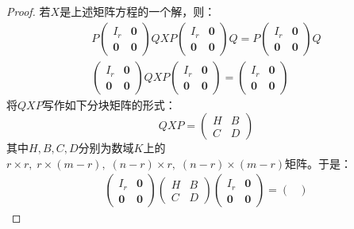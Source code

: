 \begin{proof}
	若$X$是上述矩阵方程的一个解，则：
	\begin{gather*}
		P
		\begin{pmatrix}
			I_r & \mathbf{0} \\
			\mathbf{0} & \mathbf{0}
		\end{pmatrix}
		Q
		X
		P
		\begin{pmatrix}
			I_r & \mathbf{0} \\
			\mathbf{0} & \mathbf{0}
		\end{pmatrix}
		Q
		=
		P
		\begin{pmatrix}
			I_r & \mathbf{0} \\
			\mathbf{0} & \mathbf{0}
		\end{pmatrix}
		Q  \\
		\begin{pmatrix}
			I_r & \mathbf{0} \\
			\mathbf{0} & \mathbf{0}
		\end{pmatrix}
		Q
		X
		P
		\begin{pmatrix}
			I_r & \mathbf{0} \\
			\mathbf{0} & \mathbf{0}
		\end{pmatrix}
		=
		\begin{pmatrix}
			I_r & \mathbf{0} \\
			\mathbf{0} & \mathbf{0}
		\end{pmatrix}
	\end{gather*}
	将$QXP$写作如下分块矩阵的形式：
	\begin{equation*}
		QXP=
		\begin{pmatrix}
			H & B \\
			C & D
		\end{pmatrix}
	\end{equation*}
	其中$H,B,C,D$分别为数域$K$上的$r\times r,\;r\times (m-r),\;(n-r)\times r,\;(n-r)\times(m-r)$矩阵。于是：
	\begin{gather*}
		\begin{pmatrix}
			I_r & \mathbf{0} \\
			\mathbf{0} & \mathbf{0}
		\end{pmatrix}
		\begin{pmatrix}
			H & B \\
			C & D
		\end{pmatrix}
		\begin{pmatrix}
			I_r & \mathbf{0} \\
			\mathbf{0} & \mathbf{0}
		\end{pmatrix}
		=
		\begin{pmatrix}

\end{pmatrix}
\end{gather*}
\end{proof}
